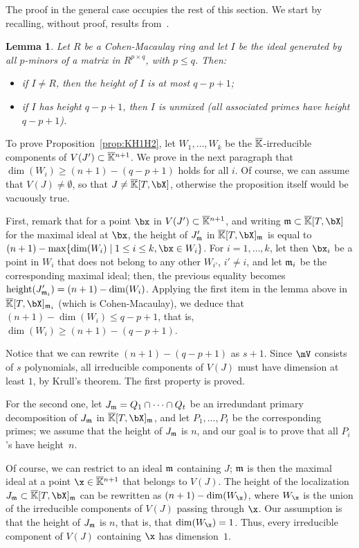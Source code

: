 \documentclass[12pt]{article}
\newtheorem{lemma}[definition]{Lemma}
\begin{document}
The proof in the general case occupies the rest of this section. We start by
recalling, without proof, results from~\cite[Section~6]{EN62}.

\begin{lemma}\label{lemma:EN}
  Let $R$ be a Cohen-Macaulay ring and let $I$ be the ideal generated
  by all $p$-minors of a matrix in $R^{p\times q}$,
  with $p \le q$. Then:
  \begin{itemize}
  \item if $I \ne R$, then the height of $I$ is at most $q-p+1$;
  \item if $I$ has height $q-p+1$, then $I$ is unmixed (all associated
    primes have height $q-p+1$).
\end{itemize}
\end{lemma}

To prove Proposition~\ref{prop:KH1H2}, let $W_1,\dots,W_k$ be the
$\overline{\mathbb{K}}$-irreducible components of $V(J')\subset \overline{\mathbb{K}}{}^{n+1}$. We prove in the
next paragraph that $\dim(W_i) \ge (n+1) -(q-p+1)$ holds for all $i$. Of course,
we can assume that $V(J)\ne \emptyset$, so that $J \ne \KKbar[T,\bX]$, otherwise
the proposition itself would be vacuously true.

First, remark that for a point $\bx$ in $V(J')\subset \overline{\mathbb{K}}{}^{n+1}$, and
writing $\m \subset \KKbar[T,\bX]$ for the maximal ideal at $\bx$, the height of
$J'_{\mathfrak{m}}$ in $\KKbar[T,\bX]_\m$ is equal to $(n+1)-\max\{ \dim(W_i) \mid 1 \le i
\le k, \bx \in W_i\}$. For $i=1,\dots,k$, let then $\bx_i$ be a point in $W_i$
that does not belong to any other $W_{i'}$, $i' \ne i$, and let $\mathfrak{m}_i$ be the
corresponding maximal ideal; then, the previous equality becomes ${\rm
  height}(J'_{\mathfrak{m}_i})=(n+1)-\dim(W_i)$. Applying the first item in the lemma above
in $\KKbar[T,\bX]_{\m_i}$ (which is Cohen-Macaulay), we deduce that
$(n+1)-\dim(W_i) \le q-p+1$, that is, $\dim(W_i) \ge (n+1) -(q-p+1)$.

Notice that we can rewrite $(n+1)-(q-p+1)$ as $s+1$.  Since $\mV$
consists of $s$ polynomials, all irreducible components of $V(J)$ must
have dimension at least $1$, by Krull's theorem. The first property
 is proved.

For the second one, let $J_{\mathfrak{m}}=Q_1 \cap \cdots \cap Q_t$ be an
irredundant primary decomposition of $J_{\mathfrak{m}}$ in $\KKbar[T,\bX]_\m$, and
let $P_1,\dots,P_t$ be the corresponding primes; we assume that the
height of $J_{\mathfrak{m}}$ is $n$, and our goal is to prove that all $P_i$'s
have height~$n$.

Of course, we can restrict to an ideal $\mathfrak{m}$ containing $J$; $\mathfrak{m}$ is
then the maximal ideal at a point $\x \in \KKbar{}^{n+1}$ that belongs
to $V(J)$. The height of the localization
$J_\m \subset \KKbar[T,\bX]_\m$ can be rewritten as
$(n+1)-\dim(W_\x)$, where $W_\x$ is the union of the irreducible
components of $V(J)$ passing through $\x$. Our assumption 
is that the height of $J_{\mathfrak{m}}$ is $n$, that is, that
$\dim(W_\x)=1$. Thus, every irreducible component of $V(J)$ containing
$\x$ has dimension~$1$.
\end{document}
